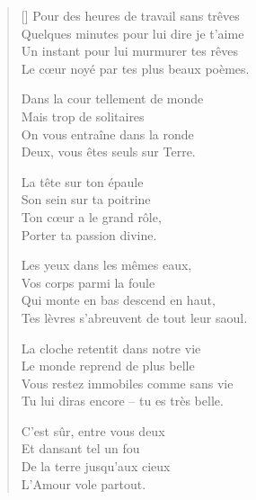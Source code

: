 \newpage

\settowidth{\versewidth}{Tes lèvres s'abreuvent de tout leur saoul.}
\begin{verse}[\versewidth]
Pour des heures de travail sans trêves \\
Quelques minutes pour lui dire je t'aime \\
Un instant pour lui murmurer tes rêves \\
Le cœur noyé par tes plus beaux poèmes.

Dans la cour tellement de monde \\
Mais trop de solitaires \\
On vous entraîne dans la ronde \\
Deux, vous êtes seuls sur Terre.

La tête sur ton épaule \\
Son sein sur ta poitrine \\
Ton cœur a le grand rôle, \\
Porter ta passion divine.

Les yeux dans les mêmes eaux, \\
Vos corps parmi la foule \\
Qui monte en bas descend en haut, \\
Tes lèvres s'abreuvent de tout leur saoul.

La cloche retentit dans notre vie \\
Le monde reprend de plus belle \\
Vous restez immobiles comme sans vie \\
Tu lui diras encore -- tu es très belle.

C'est sûr, entre vous deux \\
Et dansant tel un fou \\
De la terre jusqu'aux cieux \\
L'Amour vole partout.
\end{verse}

\newpage

